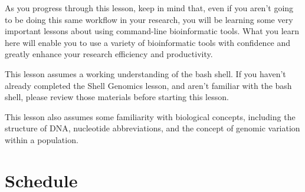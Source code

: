 \documentclass[
  letterpaper,
  DIV=11,
  numbers=noendperiod]{scrreprt}
\begin{document}
As you progress through this lesson, keep in mind that, even if you
aren't going to be doing this same workflow in your research, you will
be learning some very important lessons about using command-line
bioinformatic tools. What you learn here will enable you to use a
variety of bioinformatic tools with confidence and greatly enhance your
research efficiency and productivity.

\begin{tcolorbox}[enhanced jigsaw, toptitle=1mm, breakable, bottomrule=.15mm, colback=white, toprule=.15mm, opacityback=0, bottomtitle=1mm, coltitle=black, opacitybacktitle=0.6, rightrule=.15mm, colframe=quarto-callout-important-color-frame, titlerule=0mm, colbacktitle=quarto-callout-important-color!10!white, title={Prerequisites}, left=2mm, leftrule=.75mm, arc=.35mm]

This lesson assumes a working understanding of the bash shell. If you
haven't already completed the Shell Genomics lesson, and aren't familiar
with the bash shell, please review those materials before starting this
lesson.

This lesson also assumes some familiarity with biological concepts,
including the structure of DNA, nucleotide abbreviations, and the
concept of genomic variation within a population.

\end{tcolorbox}

\hypertarget{schedule}{%
\section*{\texorpdfstring{\textbf{Schedule}}{Schedule}}\label{schedule}}

\end{document}
